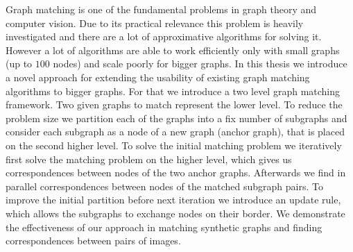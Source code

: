 Graph matching is one of the fundamental problems in graph theory and computer vision. Due to its practical relevance this problem is heavily investigated and there are a lot of approximative algorithms for solving it.
However a lot of algorithms are able to work efficiently only with small graphs (up to $100$ nodes) and scale poorly for bigger graphs. In this thesis we introduce a novel approach for extending the usability of existing graph matching algorithms to bigger graphs. For that we introduce a two level graph matching framework. Two given graphs to match represent the lower level. To reduce the problem size we partition each of the graphs into a fix number of subgraphs and consider each subgraph as a node of a new graph (anchor graph), that is placed on the second higher level. To solve the initial matching problem we iteratively first solve the matching problem on the higher level, which gives us correspondences between nodes of the two anchor graphs. Afterwards we find in parallel correspondences between nodes of the matched subgraph pairs. To improve the initial partition before next iteration we introduce an update rule, which allows the subgraphs to exchange nodes on their border. We demonstrate the effectiveness of our approach in matching synthetic graphs and finding correspondences between pairs of images.